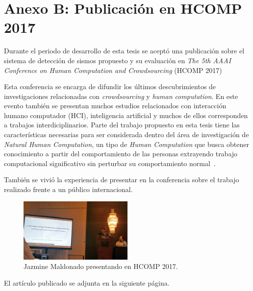 \chapter*{Anexo B: Publicación en HCOMP 2017}
\label{anexo:paper}

Durante el periodo de desarrollo de esta tesis se aceptó una publicación sobre el sistema de detección de sismos propuesto y su evaluación en \textit{The 5th AAAI Conference on Human Computation and Crowdsourcing} (HCOMP 2017)

Esta conferencia se encarga de difundir los últimos descubrimientos de investigaciones relacionadas con \textit{crowdsourcing} y \textit{human computation}. En este evento también se presentan muchos estudios relacionados con interacción humano computador (HCI), inteligencia artificial y muchos de ellos corresponden a trabajos interdiciplinarios. Parte del trabajo propuesto en esta tesis tiene las características necesarias para ser considerada dentro del área de investigación de \textit{Natural Human Computation}, un tipo de \textit{Human Computation} que busca obtener conocimiento a partir del comportamiento de las personas extrayendo trabajo computacional significativo sin perturbar su comportamiento normal~\cite{EstradaAndLawhead}. 

También se vivió la experiencia de presentar en la conferencia sobre el trabajo realizado frente a un público internacional.

\begin{figure}[!h]
\centering
	\includegraphics[width=0.5\textwidth]{imagenes/hcomp.jpg}
	\caption{Jazmine Maldonado presentando en HCOMP 2017.}
\label{fig:hcomp}
\end{figure} 

El artículo publicado se adjunta en la siguiente página. 

